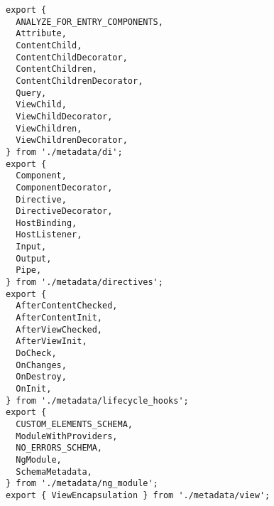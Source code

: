 \begin{verbatim}
export {
  ANALYZE_FOR_ENTRY_COMPONENTS,
  Attribute,
  ContentChild,
  ContentChildDecorator,
  ContentChildren,
  ContentChildrenDecorator,
  Query,
  ViewChild,
  ViewChildDecorator,
  ViewChildren,
  ViewChildrenDecorator,
} from './metadata/di';
export {
  Component,
  ComponentDecorator,
  Directive,
  DirectiveDecorator,
  HostBinding,
  HostListener,
  Input,
  Output,
  Pipe,
} from './metadata/directives';
export {
  AfterContentChecked,
  AfterContentInit,
  AfterViewChecked,
  AfterViewInit,
  DoCheck,
  OnChanges,
  OnDestroy,
  OnInit,
} from './metadata/lifecycle_hooks';
export {
  CUSTOM_ELEMENTS_SCHEMA,
  ModuleWithProviders,
  NO_ERRORS_SCHEMA,
  NgModule,
  SchemaMetadata,
} from './metadata/ng_module';
export { ViewEncapsulation } from './metadata/view';
\end{verbatim}
